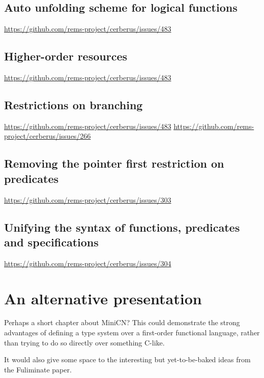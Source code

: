 \section{Auto unfolding scheme for logical functions}
\url{https://github.com/rems-project/cerberus/issues/483}

\section{Higher-order resources}
\url{https://github.com/rems-project/cerberus/issues/483}

\section{Restrictions on branching}\label{sec:restriction-branching}
\url{https://github.com/rems-project/cerberus/issues/483}
\url{https://github.com/rems-project/cerberus/issues/266}

\section{Removing the pointer first restriction on predicates}\label{sec:rm-ptr-first}
\url{https://github.com/rems-project/cerberus/issues/303}

\section{Unifying the syntax of functions, predicates and specifications}
\url{https://github.com/rems-project/cerberus/issues/304}


\chapter{An alternative presentation}\label{chap:kernel-alternative}

Perhaps a short chapter about MiniCN\@? This could demonstrate the strong
advantages of defining a type system over a first-order functional language,
rather than trying to do so directly over something C-like.

It would also give some space to the interesting but yet-to-be-baked ideas
from the Fuliminate paper.


